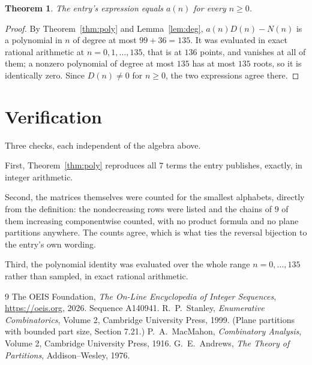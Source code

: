 \documentclass[11pt,a4paper]{article}
\theoremstyle{plain}
\newtheorem{theorem}{Theorem}
\theoremstyle{definition}
\begin{document}
\begin{theorem}
The entry's expression equals $a(n)$ for every $n\ge0$.
\end{theorem}

\begin{proof}
By Theorem~\ref{thm:poly} and Lemma~\ref{lem:deg}, $a(n)D(n)-N(n)$ is a polynomial in $n$
of degree at most $99+36=135$. It was evaluated in exact rational arithmetic at
$n=0,1,\dots,135$, that is at $136$ points, and vanishes at all of them; a nonzero polynomial
of degree at most $135$ has at most $135$ roots, so it is identically zero. Since $D(n)\neq0$
for $n\ge0$, the two expressions agree there.
\end{proof}

\section{Verification}

Three checks, each independent of the algebra above.

First, Theorem~\ref{thm:poly} reproduces all $7$ terms the entry publishes,
exactly, in integer arithmetic.

Second, the matrices themselves were counted for the smallest alphabets, directly from the
definition: the nondecreasing rows were listed and the chains of $9$ of them increasing
componentwise counted, with no product formula and no plane partitions anywhere. The counts
agree, which is what ties the reversal bijection to the entry's own wording.

Third, the polynomial identity was evaluated over the whole range $n=0,\dots,135$ rather than
sampled, in exact rational arithmetic.

\begin{thebibliography}{9}
 The OEIS Foundation, \emph{The On-Line Encyclopedia of Integer
Sequences}, \url{https://oeis.org}, 2026. Sequence A140941.
 R.~P.~Stanley, \emph{Enumerative Combinatorics}, Volume 2, Cambridge
University Press, 1999. (Plane partitions with bounded part size, Section 7.21.)
 P.~A.~MacMahon, \emph{Combinatory Analysis}, Volume 2, Cambridge
University Press, 1916.
 G.~E.~Andrews, \emph{The Theory of Partitions}, Addison--Wesley, 1976.
\end{thebibliography}
\end{document}
